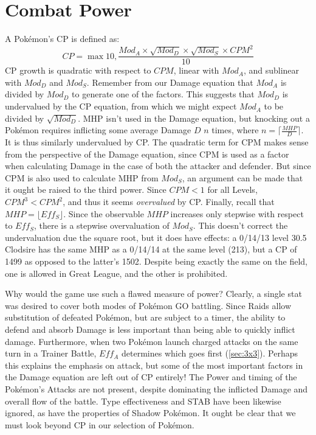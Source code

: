 \section{Combat Power\label{sec:cp}}
A Pokémon's CP is defined as:
\[ CP = \max{10, \frac{Mod_A \times \sqrt{Mod_D} \times \sqrt{Mod_S} \times CPM^2}{10}} \]
CP growth is quadratic with respect to $CPM$, linear with $Mod_A$, and
  sublinear with $Mod_D$ and $Mod_S$.
Remember from our Damage equation that $Mod_A$ is divided by $Mod_D$
 to generate one of the factors.
This suggests that $Mod_D$ is undervalued by the CP equation, from which
 we might expect $Mod_A$ to be divided by $\sqrt{Mod_D}$.
MHP isn't used in the Damage equation, but knocking out a Pokémon
 requires inflicting some average Damage $D$ $n$ times,
 where $n = \lceil\frac{MHP}{D}\rceil$.
It is thus similarly undervalued by CP\@.
The quadratic term for CPM makes sense from the perspective of the Damage
 equation, since CPM is used as a factor when calculating Damage in the
 case of both the attacker and defender.
But since CPM is also used to calculate MHP from $Mod_S$, an argument
 can be made that it ought be raised to the third power.
Since $CPM < 1$ for all Levels, $CPM^3 < CPM^2$, and thus it seems \textit{overvalued} by CP\@.
Finally, recall that $MHP = \lfloor Eff_S \rfloor$.
Since the observable $MHP$ increases only stepwise with respect to $Eff_S$,
  there is a stepwise overvaluation of $Mod_S$.
This doesn't correct the undervaluation due the square root, but it does
  have effects: a 0/14/13 level 30.5 Clodsire has the same MHP
  as a 0/14/14 at the same level (213), but a CP of 1499 as
  opposed to the latter's 1502.
Despite being exactly the same on the field, one is allowed in Great League,
  and the other is prohibited.

Why would the game use such a flawed measure of power?
Clearly, a single stat was desired to cover both modes of Pokémon GO battling.
Since Raids allow substitution of defeated Pokémon, but are subject to a timer,
  the ability to defend and absorb Damage is less important than being able to
  quickly inflict damage.
Furthermore, when two Pokémon launch charged attacks on the same turn in a Trainer
  Battle, $Eff_A$ determines which goes first (\autoref{sec:3x3}).
Perhaps this explains the emphasis on attack, but some of the most important
  factors in the Damage equation are left out of CP entirely!
The Power and timing of the Pokémon's Attacks are not present, despite
  dominating the inflicted Damage and overall flow of the battle.
Type effectiveness and STAB have been likewise ignored, as have the
  properties of Shadow Pokémon.
It ought be clear that we must look beyond CP in our selection of Pokémon.

